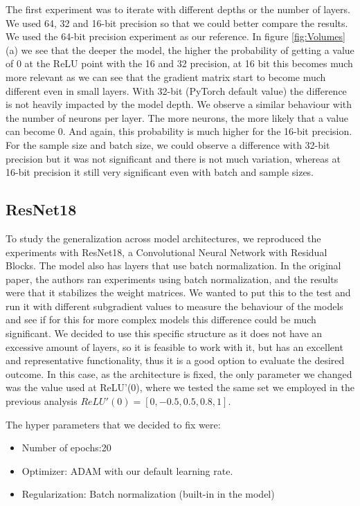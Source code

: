 The first experiment was to iterate with different depths or the number of layers. We used 64, 32 and 16-bit precision so that we could better compare the results. We used the 64-bit precision experiment as our reference. In figure \ref{fig:Volumes} (a) we see that the deeper the model, the higher the probability of getting a value of 0 at the ReLU point with the 16 and 32 precision, at 16 bit this becomes much more relevant as we can see that the gradient matrix start to become much different even in small layers. With 32-bit (PyTorch default value) the difference is not heavily impacted by the model depth. We observe a similar behaviour with the number of neurons per layer. The more neurons, the more likely that a value can become 0. And again, this probability is much higher for the 16-bit precision. For the sample size and batch size, we could observe a difference with 32-bit precision but it was not significant and there is not much variation, whereas at 16-bit precision it still very significant even with batch and sample sizes.  


\subsection{ResNet18}
\label{ResNet18}

To study the generalization across model architectures, we reproduced the experiments with ResNet18, a Convolutional Neural Network with Residual Blocks. The model also has layers that use batch normalization. In the original paper, the authors ran experiments using batch normalization, and the results were that it stabilizes the weight matrices. We wanted to put this to the test and run it with different subgradient values to measure the behaviour of the models and see if for this for more complex models this difference could be much significant. We decided to use this specific structure as it does not have an excessive amount of layers, so it is feasible to work with it, but has an excellent and representative functionality, thus it is a good option to evaluate the desired outcome. In this case, as the architecture is fixed, the only parameter we changed was the value used at ReLU'(0), where we tested the same set we employed in the previous analysis $ ReLU'(0) = [ 0 , -0.5 , 0.5 , 0.8 , 1 ]$.

The hyper parameters that we decided to fix were: 

\begin{itemize}
\item Number of epochs:20
\item Optimizer: ADAM with our default learning rate. 
\item Regularization: Batch normalization (built-in in the model)  
\end{itemize}

